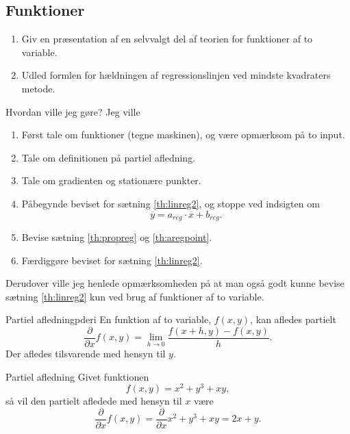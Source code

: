 \documentclass{article}
\begin{document}
\begin{tcolorbox}
    \section{Funktioner}
    \tcblower
    \begin{enumerate}
        \item Giv en præsentation af en selvvalgt del af teorien for funktioner af to variable.
        \item Udled formlen for hældningen af regressionslinjen ved mindste kvadraters metode.
    \end{enumerate}
\end{tcolorbox}

\begin{eksempel*}{Hvordan ville jeg gøre?}
    Jeg ville
    \begin{enumerate}
        \item Først tale om funktioner (tegne maskinen), og være opmærksom på
            to input.
        \item Tale om definitionen på partiel afledning.
        \item Tale om gradienten og stationære punkter.
        \item Påbegynde beviset for sætning \ref{th:linreg2}, og stoppe ved
            indsigten om
            \[
                \overline{y} = a_{reg} \cdot \overline{x} + b_{reg}.
            \] 
        \item Bevise sætning \ref{th:propreg} og \ref{th:aregpoint}.
        \item Færdiggøre beviset for sætning \ref{th:linreg2}.
    \end{enumerate}
    Derudover ville jeg henlede opmærksomheden på at man også godt kunne bevise
    sætning \ref{th:linreg2} kun ved brug af funktioner af to variable.
\end{eksempel*}

\begin{definition}{Partiel afledning}{pderi}
    En funktion af to variable, $f(x, y)$, kan afledes partielt
    \[
        \frac{\partial}{\partial x} f(x, y) = \lim_{h\rightarrow0} \frac{f(x+h, y) - f(x, y)}{h}.
    \] 
    Der afledes tilsvarende med hensyn til $y$.
\end{definition}

\begin{eksempel*}{Partiel afledning}{}
    Givet funktionen
    \[
        f(x, y) = x^2 + y^3 + xy,
    \] 
    så vil den partielt afledede med hensyn til $x$ være
    \[
        \frac{\partial}{\partial x}f(x, y) = \frac{\partial}{\partial x} x^2 + y^3 + xy = 2x + y.
    \] 
\end{eksempel*}
\end{document}
